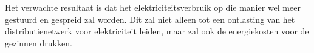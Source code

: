 \documentclass[dutch,dit,thesis]{hogentreport}
\begin{document}
Het verwachte resultaat is dat het elektriciteitsverbruik op die manier wel meer gestuurd en gespreid zal worden. Dit zal niet alleen tot een ontlasting van het distributienetwerk voor elektriciteit leiden, maar zal ook de energiekosten voor de gezinnen drukken.



%


\backmatter{}

\printbibliography[heading=bibintoc]
\end{document}
